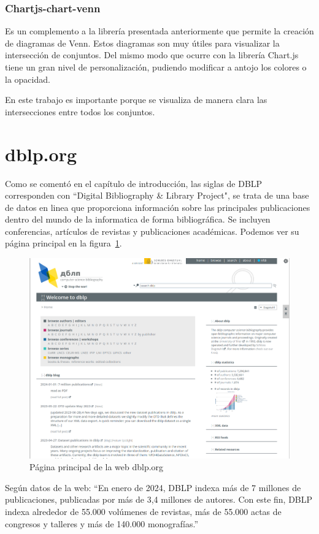 \documentclass[a4paper, 12pt]{book}
\begin{document}
\subsubsection{Chartjs-chart-venn}
Es un complemento a la librería presentada anteriormente que permite la creación de diagramas de Venn.
Estos diagramas son muy útiles para visualizar la intersección de conjuntos. Del mismo modo que ocurre con la librería Chart.js tiene un gran nivel de personalización, pudiendo modificar a antojo los colores o la opacidad.

En este trabajo es importante porque se visualiza de manera clara las intersecciones entre todos los conjuntos.


\section{dblp.org}

Como se comentó en el capítulo de introducción, las siglas de DBLP corresponden con ``Digital Bibliography \& Library Project", se trata de una base de datos en linea que proporciona información sobre las principales publicaciones dentro del mundo de la informatica de forma bibliográfica. Se incluyen conferencias, artículos de revistas y publicaciones académicas. Podemos ver su página principal en la figura~\ref{fig:web}.

\begin{figure}[h]
  \centering
  \includegraphics[width=16cm, keepaspectratio]{img/dblp_frontpage.png}
  \caption{Página principal de la web dblp.org}
  \label{fig:web}
\end{figure}
Según datos de la web: ``En enero de 2024, DBLP indexa más de 7 millones de publicaciones, publicadas por más de 3,4 millones de autores. Con este fin, DBLP indexa alrededor de 55.000 volúmenes de revistas, más de 55.000 actas de congresos y talleres y más de 140.000 monografías.''
\end{document}
